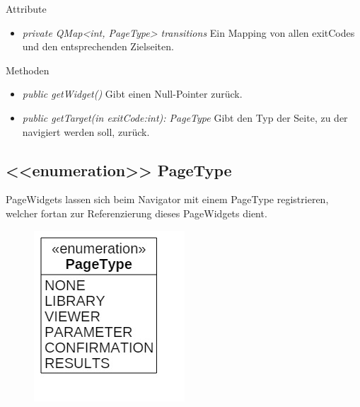 Attribute
\begin{itemize}
	\item\textit{private QMap<int, PageType> transitions}
	Ein Mapping von allen exitCodes und den entsprechenden Zielseiten.
\end{itemize}

Methoden
\begin{itemize}
	\item\textit{public getWidget()}
	Gibt einen Null-Pointer zurück.
	\item\textit{public getTarget(in exitCode:int): PageType}
	Gibt den Typ der Seite, zu der navigiert werden soll, zurück.
\end{itemize}

\pagebreak

\subsection*{<<enumeration>> PageType}
PageWidgets lassen sich beim Navigator mit einem PageType registrieren, welcher fortan zur Referenzierung dieses PageWidgets dient.

\begin{figure}[H]
\centering
\includegraphics[scale=0.5]{img/Klassendiagramm/Klassen/Controller/PageType}
\label{fig:pageType}
\end{figure}